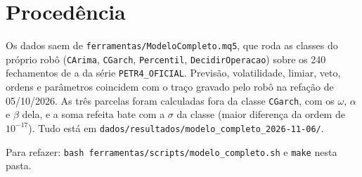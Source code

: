 \documentclass[11pt,a4paper]{article}
\begin{document}
\section{Procedência}

Os dados saem de \texttt{ferramentas/ModeloCompleto.mq5}, que roda as classes do próprio robô (\texttt{CArima},
\texttt{CGarch}, \texttt{Percentil}, \texttt{DecidirOperacao}) sobre os 240 fechamentos de \vSegIni{} a \vSegFim{} da
série \texttt{PETR4\_OFICIAL}. Previsão, volatilidade, limiar, veto, ordens e parâmetros coincidem com o traço gravado pelo
robô na refação de 05/10/2026. As três parcelas foram calculadas fora da classe \texttt{CGarch}, com os $\omega$, $\alpha$ e
$\beta$ dela, e a soma refeita bate com a $\sigma$ da classe (maior diferença da ordem de $10^{-17}$). Tudo está em
\texttt{dados/resultados/modelo\_completo\_2026-11-06/}.

Para refazer: \texttt{bash ferramentas/scripts/modelo\_completo.sh} e \texttt{make} nesta pasta.
\end{document}
